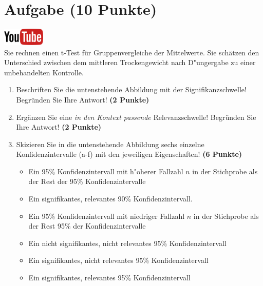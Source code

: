 \documentclass[a4paper, 9pt]{scrartcl}\usepackage[]{graphicx}\usepackage[]{xcolor}
\begin{document}
 
\clearpage

\section{Aufgabe \hfill (10 Punkte)}

\hfill\href{https://youtu.be/CN_O4fYPbhs}{\includegraphics[width =
  2cm]{img/youtube}}\\[1Ex]



Sie rechnen einen t-Test f{\"u}r Gruppenvergleiche der Mittelwerte. Sie
sch{\"a}tzen den Unterschied zwischen dem mittleren Trockengewicht nach D{"u}ngergabe zu einer unbehandelten
Kontrolle.

\begin{enumerate}
\item Beschriften Sie die untenstehende Abbildung mit der
  Signifikanzschwelle! Begr{\"u}nden Sie Ihre Antwort! \textbf{(2 Punkte)}
\item Erg{\"a}nzen Sie eine \textit{in den Kontext passende} Relevanzschwelle!
  Begr{\"u}nden Sie Ihre Antwort! \textbf{(2 Punkte)} 
\item Skizieren Sie in die
  untenstehende Abbildung sechs einzelne Konfidenzintervalle (a-f) mit den
  jeweiligen Eigenschaften! \textbf{(6 Punkte)}
  \begin{itemize}
  \item[(a)] Ein 95\% Konfidenzintervall mit h{"o}herer Fallzahl $n$ in der Stichprobe als der Rest der 95\% Konfidenzintervalle 	
  \item[(b)] Ein signifikantes, relevantes 90\% Konfidenzintervall. 	
  \item[(c)] Ein 95\% Konfidenzintervall mit niedriger Fallzahl $n$ in der Stichprobe als der Rest 95\% der Konfidenzintervalle 	
  \item[(d)] Ein nicht signifikantes, nicht relevantes 95\% Konfidenzintervall 
  \item[(e)] Ein signifikantes, nicht relevantes 95\% Konfidenzintervall
  \item[(f)] Ein signifikantes, relevantes 95\% Konfidenzintervall
  \end{itemize}
\end{enumerate}
\end{document}
